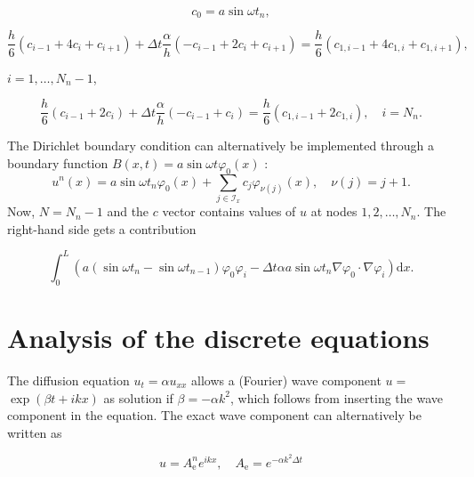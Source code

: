 \documentclass[../main.tex]{subfiles}
\begin{document}
	\begin{equation}
		\label{eqa246}
		c_{0}=a \sin \omega t_{n},
	\end{equation}

	\begin{equation}
	\label{eqa247}
		\frac{h}{6}\left(c_{i-1}+4 c_{i}+c_{i+1}\right)+\Delta t \frac{\alpha}{h}\left(-c_{i-1}+2 c_{i}+c_{i+1}\right)=\frac{h}{6}\left(c_{1, i-1}+4 c_{1, i}+c_{1, i+1}\right),
	\end{equation}

		 $i=1, \ldots, N_{n}-1$,
		 
	\begin{equation}
	\label{eqa248}
		\frac{h}{6}\left(c_{i-1}+2 c_{i}\right)+\Delta t \frac{\alpha}{h}\left(-c_{i-1}+c_{i}\right)=\frac{h}{6}\left(c_{1, i-1}+2 c_{1, i}\right), \quad i=N_{n} .
	\end{equation}
		 
		 The Dirichlet boundary condition can alternatively be implemented through a boundary function $B(x, t)=a \sin \omega t \varphi_{0}(x)$ :
		 $$
		 u^{n}(x)=a \sin \omega t_{n} \varphi_{0}(x)+\sum_{j \in \mathcal{I}_{x}} c_{j} \varphi_{\nu(j)}(x), \quad \nu(j)=j+1 .
		 $$
		 Now, $N=N_{n}-1$ and the $c$ vector contains values of $u$ at nodes $1,2, \ldots, N_{n}$. The right-hand side gets a contribution
		 
	\begin{equation}
	\label{249}
		\int_{0}^{L}\left(a\left(\sin \omega t_{n}-\sin \omega t_{n-1}\right) \varphi_{0} \varphi_{i}-\Delta t \alpha a \sin \omega t_{n} \nabla \varphi_{0} \cdot \nabla \varphi_{i}\right) \mathrm{d} x .
	\end{equation}

	\section[Analysis of the discrete equations]{Analysis of the discrete equations}
		\label{sec:sec_19_10}
		\noindent The diffusion equation $u_{t}=\alpha u_{x x}$ allows a (Fourier) wave component $u=$ $\exp (\beta t+i k x)$ as solution if $\beta=-\alpha k^{2}$, which follows from inserting the wave component in the equation. The exact wave component can alternatively be written as
	
	\begin{equation}
	\label{250}
		u=A_{\mathrm{e}}^{n} e^{i k x}, \quad A_{\mathrm{e}}=e^{-\alpha k^{2} \Delta t}
	\end{equation}
\end{document}
